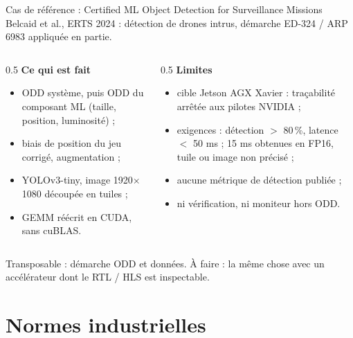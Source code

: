 \documentclass[aspectratio=169,11pt]{beamer}
\begin{document}
\begin{frame}{Cas de référence : Certified ML Object Detection for Surveillance Missions}
  \small
  Belcaid et al., ERTS 2024 : détection de drones intrus,
  démarche ED-324 / ARP 6983 appliquée en partie.

  \begin{columns}[T]
    \begin{column}{0.5\textwidth}
      \textbf{Ce qui est fait}
      \begin{itemize}
        \item ODD système, puis ODD du composant ML (taille, position, luminosité) ;
        \item biais de position du jeu corrigé, augmentation ;
        \item YOLOv3-tiny, image 1920$\times$1080 découpée en tuiles ;
        \item GEMM réécrit en CUDA, sans cuBLAS.
      \end{itemize}
    \end{column}
    \begin{column}{0.5\textwidth}
      \textbf{Limites}
      \begin{itemize}
        \item cible Jetson AGX Xavier : traçabilité arrêtée aux pilotes NVIDIA ;
        \item exigences : détection $>$ 80\,\%, latence $<$ 50 ms ; 15 ms obtenues en FP16,
              tuile ou image non précisé ;
        \item aucune métrique de détection publiée ;
        \item ni vérification, ni moniteur hors ODD.
      \end{itemize}
    \end{column}
  \end{columns}

  \vspace{0.5em}
  \alert{Transposable} : démarche ODD et données. \alert{À faire} : la même chose avec un
  accélérateur dont le RTL / HLS est inspectable.
\end{frame}

\section{Normes industrielles}
\end{document}
